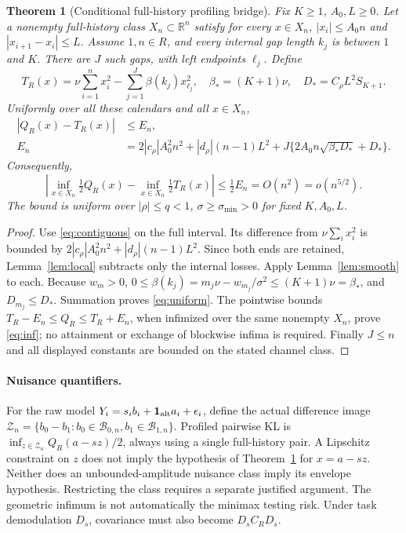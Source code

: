 \documentclass[11pt]{article}
\newtheorem{theorem}{Theorem}
\newcommand{\R}{\mathbb R}
\newcommand{\sig}{\sigma}
\begin{document}
\begin{theorem}[Conditional full-history profiling bridge]\label{thm:bridge}
Fix $K\ge1$, $A_0,L\ge0$. Let a nonempty full-history class $X_n\subset\R^n$
satisfy for every $x\in X_n$,
$|x_i|\le A_0n$ and $|x_{i+1}-x_i|\le L$.
Assume $1,n\in R$, and every internal gap length $k_j$ is between $1$ and $K$.
There are $J$ such gaps, with left endpoints $\ell_j$. Define
\begin{equation}\label{eq:surrogate}
 T_R(x)=\nu\sum_{i=1}^n x_i^2-\sum_{j=1}^J\beta(k_j)x_{\ell_j}^2,
 \quad \beta_*=(K+1)\nu,\quad D_*=C_\rho L^2S_{K+1}.
\end{equation}
Uniformly over all these calendars and all $x\in X_n$,
\begin{align}\label{eq:uniform}
 |Q_R(x)-T_R(x)|&\le E_n,\\
 E_n&=2|c_\rho|A_0^2n^2+|d_\rho|(n-1)L^2
 +J\{2A_0n\sqrt{\beta_*D_*}+D_*\}.\nonumber
\end{align}
Consequently,
\begin{equation}\label{eq:inf}
 \left|\inf_{x\in X_n}\tfrac12Q_R(x)-\inf_{x\in X_n}\tfrac12T_R(x)\right|
 \le\tfrac12E_n=O(n^2)=o(n^{5/2}).
\end{equation}
The bound is uniform over $|\rho|\le q<1$, $\sig\ge\sig_{\min}>0$ for fixed
$K,A_0,L$.
\end{theorem}
\begin{proof}
Use \eqref{eq:contiguous} on the full interval. Its difference from
$\nu\sum_i x_i^2$ is bounded by
$2|c_\rho|A_0^2n^2+|d_\rho|(n-1)L^2$.
Since both ends are retained, Lemma~\ref{lem:local} subtracts only the internal
losses. Apply Lemma~\ref{lem:smooth} to each. Because $w_m>0$,
$0\le\beta(k_j)=m_j\nu-w_{m_j}/\sig^2\le(K+1)\nu=\beta_*$,
and $D_{m_j}\le D_*$. Summation proves \eqref{eq:uniform}.
The pointwise bounds $T_R-E_n\le Q_R\le T_R+E_n$, when infimized over the
same nonempty $X_n$, prove \eqref{eq:inf}; no attainment or exchange of
blockwise infima is required. Finally $J\le n$ and all displayed constants
are bounded on the stated channel class.
\end{proof}

\paragraph{Nuisance quantifiers.}
For the raw model $Y_i=s_i b_i+\mathbf1_{\rm alt}a_i+\epsilon_i$, define the
actual difference image
$\mathcal Z_n=\{b_0-b_1:b_0\in\mathcal B_{0,n},b_1\in\mathcal B_{1,n}\}$.
Profiled pairwise KL is
$\inf_{z\in\mathcal Z_n}Q_R(a-sz)/2$, always using a single full-history pair.
A Lipschitz constraint on $z$ does not imply the hypothesis of
Theorem~\ref{thm:bridge} for $x=a-sz$. Neither does an unbounded-amplitude
nuisance class imply its envelope hypothesis. Restricting the class requires
a separate justified argument. The geometric infimum is not automatically
the minimax testing risk. Under task demodulation $D_s$, covariance must also
become $D_sC_RD_s$.
\end{document}
